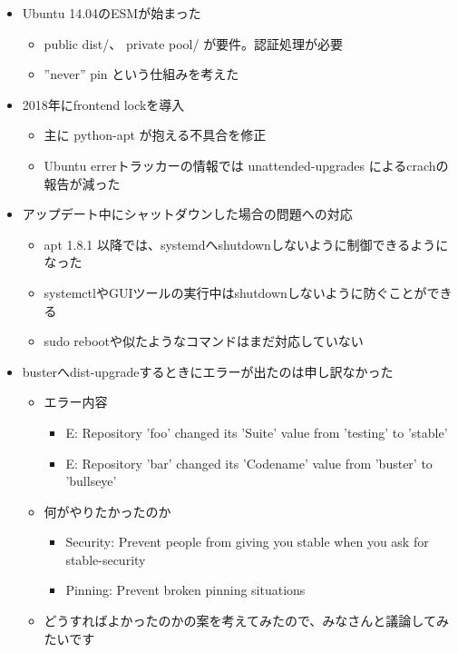 \documentclass[mingoth,a4paper]{jsarticle}
\begin{document}
%

\begin{itemize}
\item  Ubuntu 14.04のESMが始まった
  \begin{itemize}
  \item public dist/、 private pool/ が要件。認証処理が必要
  \item ''never'' pin という仕組みを考えた  
  \end{itemize}
\item 2018年にfrontend lockを導入
  \begin{itemize}
  \item 主に python-apt が抱える不具合を修正
  \item Ubuntu errerトラッカーの情報では unattended-upgrades によるcrachの報告が減った
  \end{itemize}
\item アップデート中にシャットダウンした場合の問題への対応
  \begin{itemize}
  \item apt 1.8.1 以降では、systemdへshutdownしないように制御できるようになった
  \item systemctlやGUIツールの実行中はshutdownしないように防ぐことができる
  \item sudo rebootや似たようなコマンドはまだ対応していない
  \end{itemize}
\item busterへdist-upgradeするときにエラーが出たのは申し訳なかった
  \begin{itemize}
  \item エラー内容
    \begin{itemize}
    \item E: Repository ’foo’ changed its ’Suite’ value from ’testing’ to ’stable’
    \item E: Repository ’bar’ changed its ’Codename’ value from ’buster’ to ’bullseye’
   \end{itemize}
  \item 何がやりたかったのか
    \begin{itemize}
    \item Security: Prevent people from giving you stable when you ask for stable-security
    \item Pinning: Prevent broken pinning situations
     \end{itemize}
  \item どうすればよかったのかの案を考えてみたので、みなさんと議論してみたいです

\end{itemize}
\end{itemize}
\end{document}
